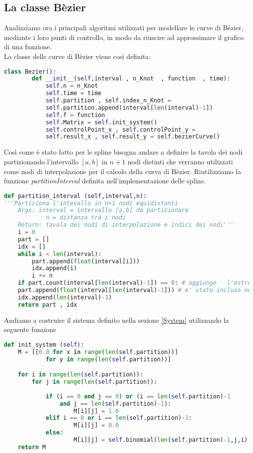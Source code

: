 \documentclass[a4paper,12pt]{report}
\theoremstyle{definition}
\begin{document}
\subsection{La classe Bèzier}
Analizziamo ora i principali algoritmi utilizzati per modellare le curve di Bèzier, mediante i loro punti di controllo, in modo da riuscire ad approssimare il grafico di una funzione.\\
La classe delle curve di Bèzier viene così definita:
\begin{lstlisting}[language=Python]
	class Bezier():
		def __init__(self,interval , n_Knot  , function  , time):
			self.n = n_Knot
			self.time = time
			self.partition , self.index_n_Knot =                               	self.partition_interval(interval,self.n)
			self.partition.append(interval[len(interval)-1])
			self.f = function
			self.Matrix = self.init_system()
			self.controlPoint_x , self.controlPoint_y =                            self.find_controlPoint()
			self.result_x , self.result_y = self.bezierCurve()
\end{lstlisting}
Così come è stato fatto per le spline bisogna andare a definire la tavola dei nodi partizionando l'intervallo $[a,b]$ in $n + 1$ nodi distinti che verranno utilizzati come nodi di interpolazione per il calcolo della curva di Bèzier. Riutilizziamo la funzione \textit{partitionInterval} definita nell'implementazione delle spline.
\begin{lstlisting}[language=Python] 
def partition_interval (self,interval,n):
'''Partiziona l'intevallo in n+1 nodi equidistanti
	Args: interval = intervallo [a,b] da partizionare
			n = distanza tra i nodi
	Return: tavola dei nodi di interpolazione e indici dei nodi'''
	i = 0
	part = []
	idx = []
	while i < len(interval):
		part.append(float(interval[i]))
		idx.append(i)
		i += n
	if part.count(interval[len(interval)-1]) == 0: # aggiungo	l'estremo dell'intervallo se non
	part.append(float(interval[len(interval)-1])) # e' stato incluso nella tavola
	idx.append(len(interval)-1)
	return part , idx
\end{lstlisting}
Andiamo a costruire il sistema definito nella sezione \ref{System} utilizzando la seguente funzione
\begin{lstlisting}[language=Python]
def init_system (self):
	M = [[0.0 for x in range(len(self.partition))] 
			for y in range(len(self.partition))] 

	for i in range(len(self.partition)): 
		for j in range(len(self.partition)):
			
			if (i == 0 and j == 0) or (i == len(self.partition)-1 
				and j == len(self.partition)-1):
					M[i][j] = 1.0
			elif i == 0 or i == len(self.partition)-1:
					M[i][j] = 0.0
			else:
					M[i][j] = self.binomial(len(self.partition)-1,j,i)
	return M
\end{lstlisting}
\end{document}
